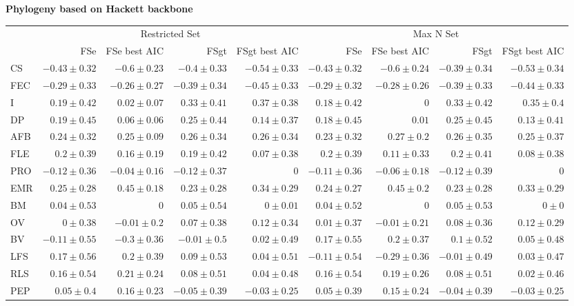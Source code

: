 \begin{landscape}
\begin{table}
\begin{footnotesize}
\textbf{Phylogeny based on Hackett backbone}

\begin{tabular}{@{}l|rrrr|rrrr@{}}
\toprule
  & \multicolumn{4}{c|}{Restricted Set} & \multicolumn{4}{c}{Max N Set}\\
  & FSe & FSe best AIC & FSgt & FSgt best AIC & FSe & FSe best AIC & FSgt & FSgt best AIC\\
\midrule
CS & $-0.43 \pm 0.32$ & $-0.6 \pm 0.23$ & $-0.4 \pm 0.33$ & $-0.54 \pm 0.33$ & $-0.43 \pm 0.32$ & $-0.6 \pm 0.24$ & $-0.39 \pm 0.34$ & $-0.53 \pm 0.34$\\
FEC & $-0.29 \pm 0.33$ & $-0.26 \pm 0.27$ & $-0.39 \pm 0.34$ & $-0.45 \pm 0.33$ & $-0.29 \pm 0.32$ & $-0.28 \pm 0.26$ & $-0.39 \pm 0.33$ & $-0.44 \pm 0.33$\\
I & $0.19 \pm 0.42$ & $0.02 \pm 0.07$ & $0.33 \pm 0.41$ & $0.37 \pm 0.38$ & $0.18 \pm 0.42$ & $0$ & $0.33 \pm 0.42$ & $0.35 \pm 0.4$\\
DP & $0.19 \pm 0.45$ & $0.06 \pm 0.06$ & $0.25 \pm 0.44$ & $0.14 \pm 0.37$ & $0.18 \pm 0.45$ & $0.01$ & $0.25 \pm 0.45$ & $0.13 \pm 0.41$\\
AFB & $0.24 \pm 0.32$ & $0.25 \pm 0.09$ & $0.26 \pm 0.34$ & $0.26 \pm 0.34$ & $0.23 \pm 0.32$ & $0.27 \pm 0.2$ & $0.26 \pm 0.35$ & $0.25 \pm 0.37$\\
FLE & $0.2 \pm 0.39$ & $0.16 \pm 0.19$ & $0.19 \pm 0.42$ & $0.07 \pm 0.38$ & $0.2 \pm 0.39$ & $0.11 \pm 0.33$ & $0.2 \pm 0.41$ & $0.08 \pm 0.38$\\
PRO & $-0.12 \pm 0.36$ & $-0.04 \pm 0.16$ & $-0.12 \pm 0.37$ & $0$ & $-0.11 \pm 0.36$ & $-0.06 \pm 0.18$ & $-0.12 \pm 0.39$ & $0$\\
EMR & $0.25 \pm 0.28$ & $0.45 \pm 0.18$ & $0.23 \pm 0.28$ & $0.34 \pm 0.29$ & $0.24 \pm 0.27$ & $0.45 \pm 0.2$ & $0.23 \pm 0.28$ & $0.33 \pm 0.29$\\
BM & $0.04 \pm 0.53$ & $0$ & $0.05 \pm 0.54$ & $0 \pm 0.01$ & $0.04 \pm 0.52$ & $0$ & $0.05 \pm 0.53$ & $0 \pm 0$\\
OV & $0 \pm 0.38$ & $-0.01 \pm 0.2$ & $0.07 \pm 0.38$ & $0.12 \pm 0.34$ & $0.01 \pm 0.37$ & $-0.01 \pm 0.21$ & $0.08 \pm 0.36$ & $0.12 \pm 0.29$\\
BV & $-0.11 \pm 0.55$ & $-0.3 \pm 0.36$ & $-0.01 \pm 0.5$ & $0.02 \pm 0.49$ & $0.17 \pm 0.55$ & $0.2 \pm 0.37$ & $0.1 \pm 0.52$ & $0.05 \pm 0.48$\\
LFS & $0.17 \pm 0.56$ & $0.2 \pm 0.39$ & $0.09 \pm 0.53$ & $0.04 \pm 0.51$ & $-0.11 \pm 0.54$ & $-0.29 \pm 0.36$ & $-0.01 \pm 0.49$ & $0.03 \pm 0.47$\\
RLS & $0.16 \pm 0.54$ & $0.21 \pm 0.24$ & $0.08 \pm 0.51$ & $0.04 \pm 0.48$ & $0.16 \pm 0.54$ & $0.19 \pm 0.26$ & $0.08 \pm 0.51$ & $0.02 \pm 0.46$\\
PEP & $0.05 \pm 0.4$ & $0.16 \pm 0.23$ & $-0.05 \pm 0.39$ & $-0.03 \pm 0.25$ & $0.05 \pm 0.39$ & $0.15 \pm 0.24$ & $-0.04 \pm 0.39$ & $-0.03 \pm 0.25$\\
\bottomrule
\end{tabular}

\end{footnotesize}
\end{table}
\end{landscape}%


